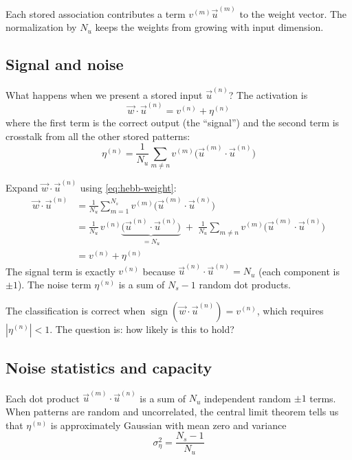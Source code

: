 \noindent Each stored association contributes a term $v^{(m)}\vec{u}^{(m)}$ to the weight vector. The normalization by $N_u$ keeps the weights from growing with input dimension.

\subsection{Signal and noise}

What happens when we present a stored input $\vec{u}^{(n)}$? The activation is
%
\begin{equation}
  \vec{w} \cdot \vec{u}^{(n)} = v^{(n)} + \eta^{(n)}
  \label{eq:signal-noise}
\end{equation}
%
where the first term is the correct output (the ``signal'') and the second term is crosstalk from all the other stored patterns:
%
\begin{equation}
  \eta^{(n)} = \frac{1}{N_u}\sum_{m \neq n} v^{(m)}\bigl(\vec{u}^{(m)} \cdot \vec{u}^{(n)}\bigr)
  \label{eq:crosstalk}
\end{equation}

\begin{derivation}
Expand $\vec{w} \cdot \vec{u}^{(n)}$ using \cref{eq:hebb-weight}:
\begin{align*}
  \vec{w} \cdot \vec{u}^{(n)}
    &= \frac{1}{N_u}\sum_{m=1}^{N_s} v^{(m)}\bigl(\vec{u}^{(m)} \cdot \vec{u}^{(n)}\bigr) \\[4pt]
    &= \frac{1}{N_u}\,v^{(n)}\underbrace{\bigl(\vec{u}^{(n)} \cdot \vec{u}^{(n)}\bigr)}_{= N_u}
      \;+\; \frac{1}{N_u}\sum_{m \neq n} v^{(m)}\bigl(\vec{u}^{(m)} \cdot \vec{u}^{(n)}\bigr) \\[4pt]
    &= v^{(n)} + \eta^{(n)}
\end{align*}
The signal term is exactly $v^{(n)}$ because $\vec{u}^{(n)} \cdot \vec{u}^{(n)} = N_u$ (each component is $\pm 1$). The noise term $\eta^{(n)}$ is a sum of $N_s - 1$ random dot products.
\end{derivation}

\noindent The classification is correct when $\operatorname{sign}(\vec{w} \cdot \vec{u}^{(n)}) = v^{(n)}$, which requires $|{\eta^{(n)}}| < 1$. The question is: how likely is this to hold?

\subsection{Noise statistics and capacity}

Each dot product $\vec{u}^{(m)} \cdot \vec{u}^{(n)}$ is a sum of $N_u$ independent random $\pm 1$ terms. When patterns are random and uncorrelated, the central limit theorem tells us that $\eta^{(n)}$ is approximately Gaussian with mean zero and variance
%
\begin{equation}
  \sigma_\eta^2 = \frac{N_s - 1}{N_u}
  \label{eq:noise-variance}
\end{equation}

